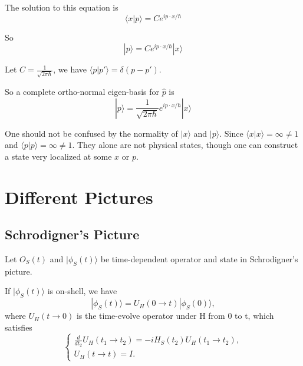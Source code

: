 \documentclass[12pt]{book}
\begin{document}
	The solution to this equation is 
	\begin{equation}
		\langle x|p\rangle=Ce^{i p\cdot x/\hbar}
	\end{equation}
	
	So
	\begin{equation}
		|p\rangle=Ce^{i p\cdot x/\hbar}|x\rangle
	\end{equation}
	
	Let $C=\frac 1{\sqrt{2\pi\hbar}}$, we have $\langle p|p'\rangle=\delta(p-p')$.
	
	So a complete ortho-normal eigen-basis for $\hat p$ is
	\begin{equation}
		|p\rangle=\frac 1{\sqrt{2\pi\hbar}}e^{i p\cdot x/\hbar}|x\rangle
	\end{equation}
	
	One should not be confused by the normality of $|x\rangle$ and $|p\rangle$. Since $\langle x|x\rangle=\infty\neq1$ and $\langle p|p\rangle=\infty\neq1$. They alone are not physical states, though one can construct a state very localized at some $x$ or $p$.

	\section{Different Pictures}
	\subsection{Schrodigner's Picture}
	
	Let $O_S(t)$ and $|\phi_S(t)\rangle$ be time-dependent operator and state in Schrodigner's picture. 
	
	If $|\phi_S(t)\rangle$ is on-shell, we have 
	\begin{equation}
		|\phi_S(t)\rangle=U_H(0\rightarrow t)|\phi_S(0)\rangle,
	\end{equation}	
	where $U_H(t\rightarrow 0)$ is the time-evolve operator under H from 0 to t, which satisfies
	\begin{equation}
		\left\{\begin{array}{l}
			\frac d {dt_2} U_H(t_1\rightarrow t_2)=-iH_S(t_2)U_H(t_1\rightarrow t_2),\\
			U_H(t\rightarrow t)=I .
		\end{array}  \right. 
	\end{equation}
	
\end{document}
